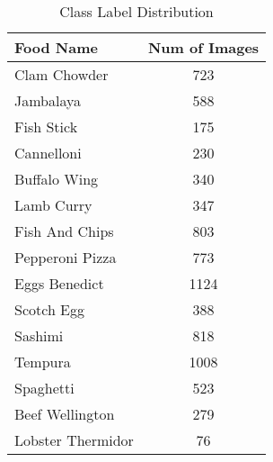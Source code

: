 
\begin{table}
\begin{center}
\begin{tabular}{|l|c|}
\hline
Food Name & Num of Images \\
\hline\hline
Clam Chowder&723\\
Jambalaya&588\\
Fish Stick&175\\
Cannelloni&230\\
Buffalo Wing&340\\
Lamb Curry&347\\
Fish And Chips&803\\
Pepperoni Pizza&773\\
Eggs Benedict&1124\\
Scotch Egg&388\\
Sashimi&818\\
Tempura&1008\\
Spaghetti&523\\
Beef Wellington&279\\
Lobster Thermidor&76\\
\hline
\end{tabular}
\end{center}
\caption{Class Label Distribution}
\label{table:classdistribution}
\end{table}

